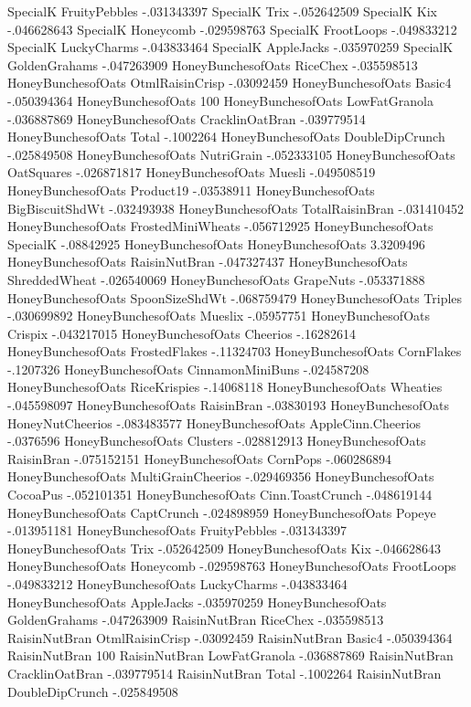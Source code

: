SpecialK	FruityPebbles	-.031343397
SpecialK	Trix	-.052642509
SpecialK	Kix	-.046628643
SpecialK	Honeycomb	-.029598763
SpecialK	FrootLoops	-.049833212
SpecialK	LuckyCharms	-.043833464
SpecialK	AppleJacks	-.035970259
SpecialK	GoldenGrahams	-.047263909
HoneyBunchesofOats	RiceChex	-.035598513
HoneyBunchesofOats	OtmlRaisinCrisp	-.03092459
HoneyBunchesofOats	Basic4	-.050394364
HoneyBunchesofOats	100%
HoneyBunchesofOats	LowFatGranola	-.036887869
HoneyBunchesofOats	CracklinOatBran	-.039779514
HoneyBunchesofOats	Total	-.1002264
HoneyBunchesofOats	DoubleDipCrunch	-.025849508
HoneyBunchesofOats	NutriGrain	-.052333105
HoneyBunchesofOats	OatSquares	-.026871817
HoneyBunchesofOats	Muesli	-.049508519
HoneyBunchesofOats	Product19	-.03538911
HoneyBunchesofOats	BigBiscuitShdWt	-.032493938
HoneyBunchesofOats	TotalRaisinBran	-.031410452
HoneyBunchesofOats	FrostedMiniWheats	-.056712925
HoneyBunchesofOats	SpecialK	-.08842925
HoneyBunchesofOats	HoneyBunchesofOats	3.3209496
HoneyBunchesofOats	RaisinNutBran	-.047327437
HoneyBunchesofOats	ShreddedWheat	-.026540069
HoneyBunchesofOats	GrapeNuts	-.053371888
HoneyBunchesofOats	SpoonSizeShdWt	-.068759479
HoneyBunchesofOats	Triples	-.030699892
HoneyBunchesofOats	Mueslix	-.05957751
HoneyBunchesofOats	Crispix	-.043217015
HoneyBunchesofOats	Cheerios	-.16282614
HoneyBunchesofOats	FrostedFlakes	-.11324703
HoneyBunchesofOats	CornFlakes	-.1207326
HoneyBunchesofOats	CinnamonMiniBuns	-.024587208
HoneyBunchesofOats	RiceKrispies	-.14068118
HoneyBunchesofOats	Wheaties	-.045598097
HoneyBunchesofOats	RaisinBran	-.03830193
HoneyBunchesofOats	HoneyNutCheerios	-.083483577
HoneyBunchesofOats	AppleCinn.Cheerios	-.0376596
HoneyBunchesofOats	Clusters	-.028812913
HoneyBunchesofOats	RaisinBran	-.075152151
HoneyBunchesofOats	CornPops	-.060286894
HoneyBunchesofOats	MultiGrainCheerios	-.029469356
HoneyBunchesofOats	CocoaPus	-.052101351
HoneyBunchesofOats	Cinn.ToastCrunch	-.048619144
HoneyBunchesofOats	CaptCrunch	-.024898959
HoneyBunchesofOats	Popeye	-.013951181
HoneyBunchesofOats	FruityPebbles	-.031343397
HoneyBunchesofOats	Trix	-.052642509
HoneyBunchesofOats	Kix	-.046628643
HoneyBunchesofOats	Honeycomb	-.029598763
HoneyBunchesofOats	FrootLoops	-.049833212
HoneyBunchesofOats	LuckyCharms	-.043833464
HoneyBunchesofOats	AppleJacks	-.035970259
HoneyBunchesofOats	GoldenGrahams	-.047263909
RaisinNutBran	RiceChex	-.035598513
RaisinNutBran	OtmlRaisinCrisp	-.03092459
RaisinNutBran	Basic4	-.050394364
RaisinNutBran	100%
RaisinNutBran	LowFatGranola	-.036887869
RaisinNutBran	CracklinOatBran	-.039779514
RaisinNutBran	Total	-.1002264
RaisinNutBran	DoubleDipCrunch	-.025849508

